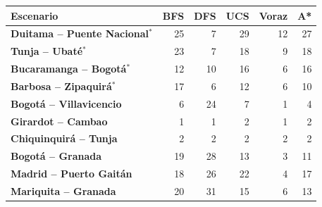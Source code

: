 \renewcommand{\arraystretch}{1.2}
\begin{tabular}{|l|r|r|r|r|r|}
\hline
\rowcolor{gray!20} \textbf{Escenario} & \textbf{BFS} & \textbf{DFS} & \textbf{UCS} & \textbf{Voraz} & \textbf{A*} \\
\hline
\textbf{Duitama -- Puente Nacional$^{*}$} & 25 & 7 & 29 & 12 & 27 \\
\hline
\textbf{Tunja -- Ubaté$^{*}$} & 23 & 7 & 18 & 9 & 18 \\
\hline
\textbf{Bucaramanga -- Bogotá$^{*}$} & 12 & 10 & 16 & 6 & 16 \\
\hline
\textbf{Barbosa -- Zipaquirá$^{*}$} & 17 & 6 & 12 & 6 & 10 \\
\hline
\textbf{Bogotá -- Villavicencio} & 6 & 24 & 7 & 1 & 4 \\
\hline
\textbf{Girardot -- Cambao} & 1 & 1 & 2 & 1 & 2 \\
\hline
\textbf{Chiquinquirá -- Tunja} & 2 & 2 & 2 & 2 & 2 \\
\hline
\textbf{Bogotá -- Granada} & 19 & 28 & 13 & 3 & 11 \\
\hline
\textbf{Madrid -- Puerto Gaitán} & 18 & 26 & 22 & 4 & 17 \\
\hline
\textbf{Mariquita -- Granada} & 20 & 31 & 15 & 6 & 13 \\
\hline
\end{tabular}
